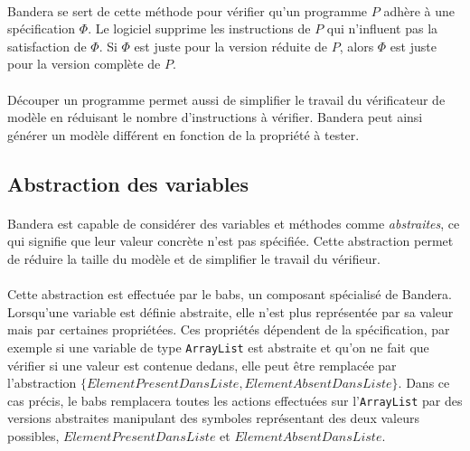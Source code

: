 \paragraph{}
Bandera se sert de cette méthode pour vérifier qu'un programme $P$
adhère à une spécification $\Phi$. Le logiciel supprime les
instructions de $P$ qui n'influent pas la satisfaction de $\Phi$. Si
$\Phi$ est juste pour la version réduite de $P$, alors $\Phi$ est
juste pour la version complète de $P$.

\paragraph{}
Découper un programme permet aussi de simplifier le travail du
vérificateur de modèle en réduisant le nombre d'instructions à
vérifier. Bandera peut ainsi générer un modèle différent en fonction
de la propriété à tester.

\subsection{Abstraction des variables}
\label{sec:bandera_abstraction}

\paragraph{}
Bandera est capable de considérer des variables et méthodes comme
\textit{abstraites}, ce qui signifie que leur valeur concrète n'est
pas spécifiée. Cette abstraction permet de réduire la taille du modèle
et de simplifier le travail du vérifieur.

\paragraph{}
Cette abstraction est effectuée par le \gls{babs}, un composant
spécialisé de Bandera. Lorsqu'une variable est définie abstraite, elle
n'est plus représentée par sa valeur mais par certaines
propriétées. Ces propriétés dépendent de la spécification, par exemple
si une variable de type \verb|ArrayList| est abstraite et qu'on ne
fait que vérifier si une valeur est contenue dedans, elle peut être
remplacée par l'abstraction
$\{ ElementPresentDansListe, ElementAbsentDansListe \}$. Dans ce cas
précis, le \gls{babs} remplacera toutes les actions effectuées sur
l'\verb|ArrayList| par des versions abstraites manipulant des symboles
représentant des deux valeurs possibles, $ElementPresentDansListe$ et
$ElementAbsentDansListe$.

